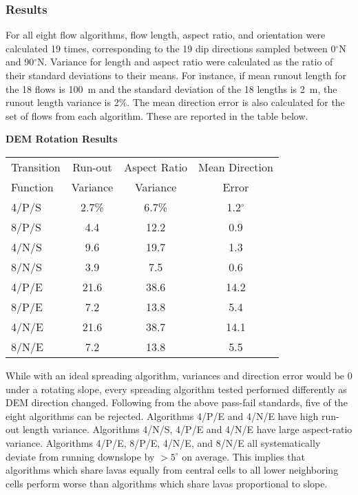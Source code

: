		
		
		\subsubsection{Results}

		For all eight flow algorithms, flow length, aspect ratio, and orientation were calculated 19 times, corresponding to the 19 dip directions sampled between 0$^{\circ}$N and 90$^{\circ}$N. Variance for length and aspect ratio were calculated as the ratio of their standard deviations to their means. For instance, if mean runout length for the 18 flows is 100~m and the standard deviation of the 18 lengths is 2~m, the runout length variance is 2\%. The mean direction error is also calculated for the set of flows from each algorithm. These are reported in the table below.

			\begin{center}
				\textbf{DEM Rotation Results}
				
				\begin{tabular}{l c c c}
					\toprule
					Transition&Run-out&Aspect Ratio&Mean Direction\\
					Function&Variance&Variance&Error\\
					\midrule
					4/P/S &2.7\%&6.7\%&1.2$^{\circ}$\\
					8/P/S &4.4&12.2&0.9\\
					4/N/S &9.6&19.7&1.3\\
					8/N/S &3.9&7.5&0.6\\
					4/P/E &21.6&38.6&14.2\\
					8/P/E &7.2&13.8&5.4\\
					4/N/E &21.6&38.7&14.1\\
					8/N/E &7.2&13.8&5.5\\
			
					\bottomrule
				\end{tabular}
			\end{center}

			While with an ideal spreading algorithm, variances and direction error would be 0 under a rotating slope, every spreading algorithm tested performed differently as DEM direction changed. Following from the above pass-fail standards, five of the eight algorithms can be rejected. Algorithms 4/P/E and 4/N/E have high run-out length variance. Algorithms 4/N/S, 4/P/E and 4/N/E have large aspect-ratio variance. Algorithms 4/P/E, 8/P/E, 4/N/E, and 8/N/E all systematically deviate from running downslope by $>5^{\circ}$ on average. This implies that algorithms which share lavas equally from central cells to all lower neighboring cells perform worse than algorithms which share lavas proportional to slope.
			
